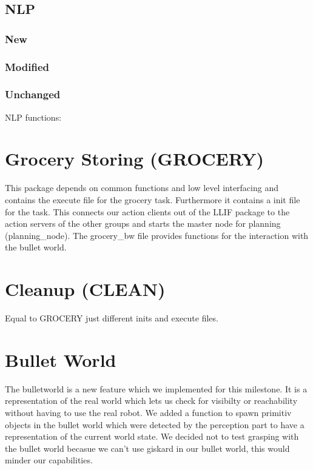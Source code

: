\documentclass[main.tex]{subfiles}
\begin{document}
                \subsection{NLP}
                \subsubsection{New}
                \subsubsection{Modified}
                \subsubsection{Unchanged}NLP functions:
                
                \section{Grocery Storing (GROCERY)}
                This package depends on common functions and low level interfacing and contains the execute file for the grocery task. Furthermore it contains a init file for the task. This connects our action clients out of the LLIF package to the action servers of the other groups and starts the master node for planning (planning\_node). The grocery\_bw file provides functions for the interaction with the bullet world.   
                \section{Cleanup (CLEAN)}
                Equal to GROCERY just different inits and execute files.
                \section{Bullet World}
                The bulletworld is a new feature which we implemented for this milestone. It is a representation of the real world which lets us check for visibilty or reachability without having to use the real robot. We added a function to spawn primitiv objects in the bullet world which were detected by the perception part to have a representation of the current world state. We decided not to test grasping with the bullet world becasue we can't use giskard in our bullet world, this would minder our capabilities.
                
\end{document}
